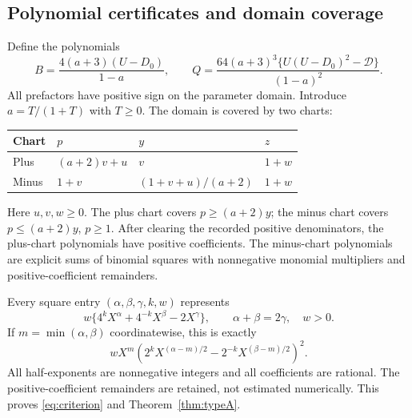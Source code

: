 \documentclass[11pt]{article}
\begin{document}
\subsection{Polynomial certificates and domain coverage}
Define the polynomials
\[
 B=\frac{4(a+3)(U-D_0)}{1-a},\qquad
 Q=\frac{64(a+3)^3\{U(U-D_0)^2-\mathcal D\}}{(1-a)^2}.
\]
All prefactors have positive sign on the parameter domain. Introduce
$a=T/(1+T)$ with $T\ge0$. The domain is covered by two charts:
\begin{center}
\begin{tabular}{llll}
\toprule
Chart & $p$ & $y$ & $z$\\
\midrule
Plus & $(a+2)v+u$ & $v$ & $1+w$\\
Minus & $1+v$ & $(1+v+u)/(a+2)$ & $1+w$\\
\bottomrule
\end{tabular}
\end{center}
Here $u,v,w\ge0$. The plus chart covers $p\ge(a+2)y$; the minus chart covers
$p\le(a+2)y$, $p\ge1$. After clearing the recorded positive denominators,
the plus-chart polynomials have positive coefficients. The minus-chart
polynomials are explicit sums of binomial squares with nonnegative monomial
multipliers and positive-coefficient remainders.

Every square entry $(\alpha,\beta,\gamma,k,w)$ represents
\[
 w\{4^kX^\alpha+4^{-k}X^\beta-2X^\gamma\},\qquad
 \alpha+\beta=2\gamma,\quad w>0.
\]
If $m=\min(\alpha,\beta)$ coordinatewise, this is exactly
\[
 wX^m\left(2^kX^{(\alpha-m)/2}-2^{-k}X^{(\beta-m)/2}\right)^2.
\]
All half-exponents are nonnegative integers and all coefficients are rational.
The positive-coefficient remainders are retained, not estimated numerically.
This proves \eqref{eq:criterion} and Theorem~\ref{thm:typeA}.
\end{document}
